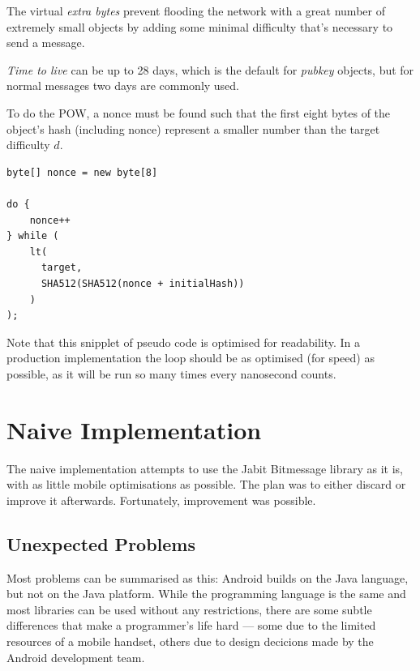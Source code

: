 \documentclass{bfh}
\begin{document}
  The virtual \textit{extra bytes} prevent flooding the network with a great number of extremely small objects by adding some minimal difficulty that's necessary to send a message.

  \textit{Time to live} can be up to 28 days, which is the default for \textit{pubkey} objects, but for normal messages two days are commonly used.

  To do the \acl{POW}, a \acs{nonce} must be found such that the first eight bytes of the object's hash (including \acs{nonce}) represent a smaller number than the target difficulty $d$.\\

\begin{lstlisting}
byte[] nonce = new byte[8]

do {
    nonce++
} while (
    lt(
      target,
      SHA512(SHA512(nonce + initialHash))
    )
);
\end{lstlisting}


  Note that this snipplet of pseudo code is optimised for readability. In a production implementation the loop should be as optimised (for speed) as possible, as it will be run so many times every nanosecond counts.


  \newpage
  \section{Naive Implementation}
  
  The naive implementation attempts to use the Jabit Bitmessage library as it is, with as little mobile optimisations as possible. The plan was to either discard or improve it afterwards. Fortunately, improvement was possible.

  \subsection{Unexpected Problems}
  Most problems can be summarised as this: Android builds on the Java language, but not on the Java platform. While the programming language is the same and most libraries can be used without any restrictions, there are some subtle differences that make a programmer's life hard --- some due to the limited resources of a mobile handset, others due to design decicions made by the Android development team.
  
\end{document}
